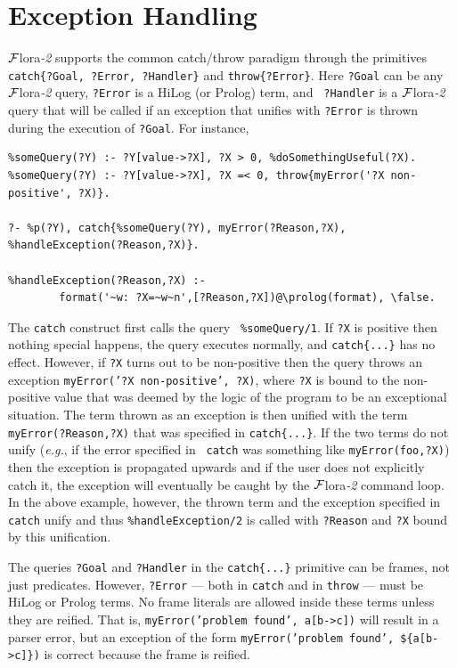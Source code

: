 \documentclass[11pt]{article}
\newcommand{\FLORA}{{\mbox{\sc ${\cal F}${lora}\rm\emph{-2}}}\xspace}
\newcommand{\FLSYSTEM}{\FLORA}
\begin{document}
\section{Exception Handling}\label{sec-errors}

\FLSYSTEM supports the common catch/throw paradigm through the primitives {\tt
  catch\{?Goal, ?Error, ?Handler\}} and {\tt throw\{?Error\}}.  Here {\tt ?Goal}
can be any \FLSYSTEM query, {\tt ?Error} is a HiLog (or Prolog) term, and {\tt
  ?Handler} is a \FLSYSTEM query that will be called if an exception that
unifies with {\tt ?Error} is thrown during the execution of {\tt ?Goal}. For
instance,

\begin{verbatim}
%someQuery(?Y) :- ?Y[value->?X], ?X > 0, %doSomethingUseful(?X).  
%someQuery(?Y) :- ?Y[value->?X], ?X =< 0, throw{myError('?X non-positive', ?X)}.

?- %p(?Y), catch{%someQuery(?Y), myError(?Reason,?X), %handleException(?Reason,?X)}.

%handleException(?Reason,?X) :-
        format('~w: ?X=~w~n',[?Reason,?X])@\prolog(format), \false.
\end{verbatim}
The {\tt catch} construct first calls the query {\tt
  \verb|%|someQuery/1}. If {\tt ?X} is positive then nothing special
  happens, the query executes normally, and {\tt catch\{...\}} has no
  effect.  However, if {\tt ?X} turns out to be non-positive then the
  query throws an exception {\tt myError('?X {\tt non-positive', ?X)}},
  where {\tt ?X} is bound to the non-positive value that was deemed by
  the logic of the program to be an exceptional situation.  The term
  thrown as an exception is then unified with the term {\tt
  myError(?Reason,?X)} that was specified in {\tt catch\{...\}}. If the
  two terms do not unify ({\it e.g.}, if the error specified in {\tt
  catch} was something like {\tt myError(foo,?X)}) then the exception is
  propagated upwards and if the user does not explicitly catch it, the
  exception will eventually be caught by the \FLSYSTEM command loop. In the
  above example,
  however, the thrown term and the exception specified in
  {\tt catch} unify and thus {\tt \verb|%|handleException/2} is called
  with {\tt ?Reason} and {\tt ?X} bound by this unification.

The queries {\tt ?Goal} and {\tt ?Handler} in the {\tt catch\{...\}}
primitive can be frames, not just predicates. However, {\tt ?Error}
--- both in {\tt catch} and in {\tt throw} --- must be HiLog or Prolog
terms.  No frame literals are allowed inside these terms unless they are
reified. That is, {\tt myError('problem found', a[b->c])} will result in a
parser error, but an exception of the form {\tt myError('problem found',
  \$\{a[b->c]\})} is correct because the frame is reified.
\end{document}
